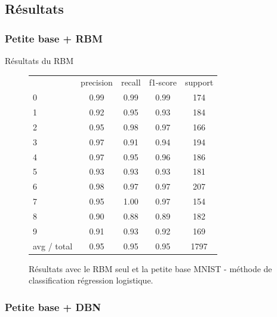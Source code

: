 \subsection{Résultats}

\subsubsection{Petite base + RBM}

\begin{frame}{Résultats du RBM}
	\begin{figure}[ht!]
	\centering
	\begin{tabular}{l|c|c|c|c}
						 &  precision  &  recall & f1-score  & support \\
						0&       0.99   &   0.99    &  0.99   &    174 \\
						1 &      0.92    &  0.95     & 0.93     &  184 \\
						2  &     0.95    &  0.98      &0.97    &   166 \\
						3   &    0.97    &  0.91     & 0.94   &    194 \\
						4    &   0.97    &  0.95    &  0.96  &     186 \\
						5     &  0.93  &    0.93     & 0.93 &      181 \\
						6      & 0.98    &  0.97    &  0.97&       207 \\
						7       &0.95  &    1.00    &  0.97   &    154 \\
						8       &0.90   &   0.88     & 0.89   &    182 \\
						9 &      0.91    &  0.93    &  0.92     &  169 \\
	avg / total  &     0.95    &  0.95    &  0.95    &  1797 \\
	\end{tabular}
	\caption{Résultats avec le RBM seul et la petite base MNIST - méthode de classification régression logistique.}
	\end{figure} 
\end{frame}

\subsubsection{Petite base + DBN}

